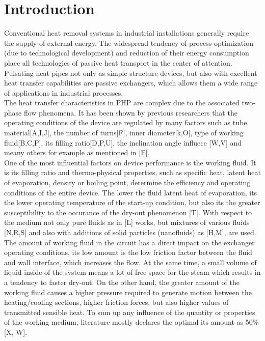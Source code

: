 \documentclass[article]{elsarticle}
\begin{document}
\section{Introduction}
\label{sec:intro}
Conventional heat removal systems in industrial installations generally require the supply of external energy. The widespread tendency of process optimization (due to technological development) and reduction of their energy consumption place all technologies of passive heat transport in the center of attention. Pulsating heat pipes not only as simple structure devices, but also with excellent heat transfer capabilities are passive exchangers, which allows them a wide range of applications in industrial processes.\\
The heat transfer characteristics in PHP are complex due to the associated two-phase flow phenomena. It has been shown by previous researchers that the operating conditions of the device are regulated by many factors such as tube material[A,I,J], the number of turns[F], inner diameter[k,O], type of working fluid[B,C,P],  its filling ratio[D,P,U], the inclination angle influece [W,V] and meany others for example as mentioned in [E].\\ 
One of the most influential factors on device performance is the working fluid. It is its filling ratio and thermo-physical properties, such as specific heat, latent heat of evaporation, density or boiling point, determine the efficiency and operating conditions of the entire device. The lower the fluid latent heat of evaporation, its the lower operating temperature of the start-up condition, but also its the greater susceptibility to the occurance of the dry-out phenomenon [T]. With respect to the medium not only pure fluids as in [L] works, but mixtures of various fluids [N,R,S] and also  with additions of solid particles (nanofluids) as [H,M], are used. The amount of working fluid in the circuit has a direct impact on the exchanger operating conditions, its low amount is the low friction factor between the fluid and wall interface, which increases the flow. At the same time, a small volume of liquid inside of the system means a lot of free space for the steam which results in a tendency to faster dry-out. On the other hand, the greater amount of the working fluid causes a higher pressure required to generate motion between the heating/cooling sections, higher friction forces, but also higher values of transmitted sensible heat. To sum up any influence of the quantity or properties of the working medium, literature mostly declares the optimal its amount as 50$\%$ [X, W].\\
\end{document}

